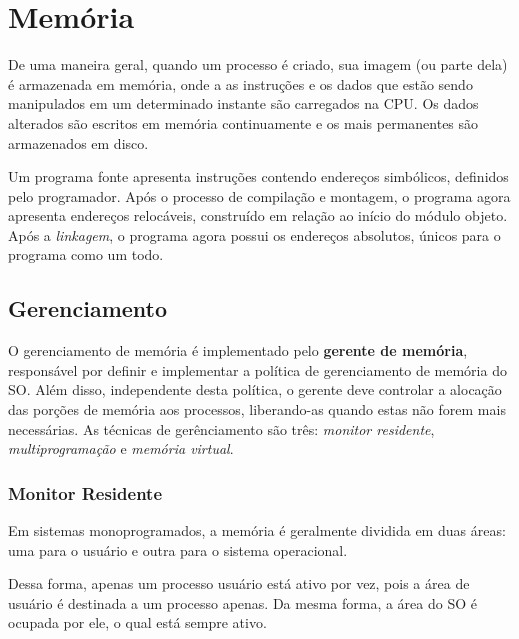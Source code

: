 \chapter{Memória}
De uma maneira geral, quando um processo é criado, sua imagem (ou parte dela) é armazenada em memória, onde a as instruções e os dados que estão sendo manipulados em um determinado instante são carregados na CPU. Os dados alterados são escritos em memória continuamente e os mais permanentes são armazenados em disco.

Um programa fonte apresenta instruções contendo endereços simbólicos, definidos pelo programador. Após o processo de compilação e montagem, o programa agora apresenta endereços relocáveis, construído em relação ao início do módulo objeto. Após a \textit{linkagem}, o programa agora possui os endereços absolutos, únicos para o programa como um todo.

















\section{Gerenciamento}
O gerenciamento de memória é implementado pelo \textbf{gerente de memória}, responsável por definir e implementar a política de gerenciamento de memória do SO. Além disso, independente desta política, o gerente deve controlar a alocação das porções de memória aos processos, liberando-as quando estas não forem mais necessárias. As técnicas de gerênciamento são três: \textit{monitor residente}, \textit{multiprogramação} e \textit{memória virtual}.






\subsection{Monitor Residente}
Em sistemas monoprogramados, a memória é geralmente dividida em duas áreas: uma para o usuário e outra para o sistema operacional.

Dessa forma, apenas um processo usuário está ativo por vez, pois a área de usuário é destinada a um processo apenas. Da mesma forma, a área do SO é ocupada por ele, o qual está sempre ativo.

